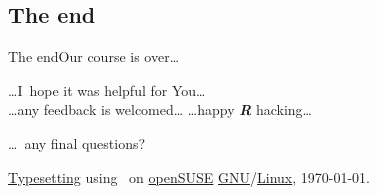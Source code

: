 \documentclass[compress, ucs, xelatex, 11pt, xcolor=svgnames,
  hyperref={
    bookmarks=true,
    unicode=true,
    colorlinks=true,
    pdftitle={Molecular data in R},
    plainpages=false,
    pdfauthor={Vojtech Zeisek},
    pdfsubject={Course about phylogeny and evolution in R},
    pdfcreator={XeLaTeX},
    pdfkeywords={R, evolution, phylogeny, molecular data},
    linkcolor=Tomato,
    anchorcolor=SaddleBrown,
    citecolor=Goldenrod,
    filecolor=DarkMagenta,
    menucolor=Sienna,
    urlcolor=DarkTurquoise,
    pdftex},
  url={hyphens, lowtilde} %
  ]{beamer}
\begin{document}
\subsection{The end}

\begin{frame}{The end}{Our course is over\ldots}
\begin{center}
  \ldots I~hope it was helpful for You\ldots\\
  \vfill
  \ldots any feedback is welcomed\ldots
  \vfill
  \ldots happy \textbf{\textit{R}} hacking\ldots
  \vfill
\end{center}
\begin{flushright}
  \ldots~any final questions?
  \vfill
  \begin{tiny}
   \href{https://en.wikipedia.org/wiki/XeTeX}{Typesetting} using \XeLaTeX~on \href{https://www.opensuse.org/}{openSUSE} \href{https://en.wikipedia.org/wiki/GNU}{GNU}/\href{https://en.wikipedia.org/wiki/Linux}{Linux}, \today.
  \end{tiny}
\end{flushright}
\end{frame}
\end{document}
